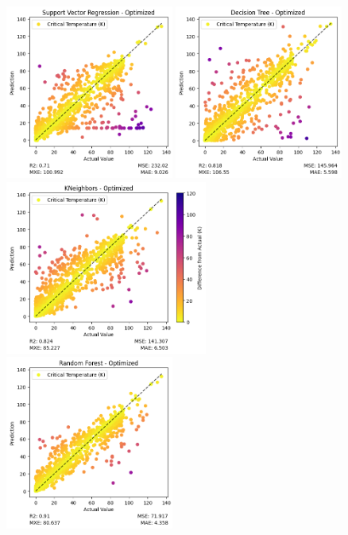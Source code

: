 \documentclass[twocolumn, nofootinbib, secnumarabic, amssymb, nobibnotes, aps, prd]{revtex4-2}
\begin{document}
\begin{figure}[t]
   \includegraphics[height=2.25in]{images/subfigures/no_uncertainty/support_vector_regression_optimized.png}
   \includegraphics[height=2.25in]{images/subfigures/no_uncertainty/decision_tree_optimized.png}
   \includegraphics[height=2.25in]{images/subfigures/no_uncertainty/kneighbors_optimized.png}
   \includegraphics[height=2.25in]{images/subfigures/no_uncertainty/random_forest_optimized.png}

\end{figure}
\end{document}
